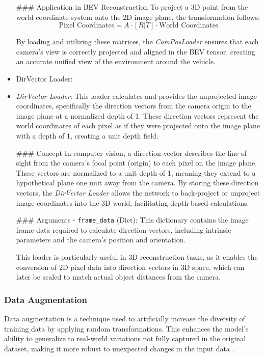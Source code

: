 \begin{itemize}
### Application in BEV Reconstruction
To project a 3D point from the world coordinate system onto the 2D image plane, the transformation follows:
\begin{equation}
    \text{Pixel Coordinates} = A \cdot [R | T] \cdot \text{World Coordinates}
\end{equation}

By loading and utilizing these matrices, the \textit{CamPosLoader} ensures that each camera’s view is correctly projected and aligned in the BEV tensor, creating an accurate unified view of the environment around the vehicle.

\item DirVector Loader:\item \textit{DirVector Loader}: This loader calculates and provides the unprojected image coordinates, specifically the direction vectors from the camera origin to the image plane at a normalized depth of 1. These direction vectors represent the world coordinates of each pixel as if they were projected onto the image plane with a depth of 1, creating a unit depth field.

### Concept
In computer vision, a direction vector describes the line of sight from the camera’s focal point (origin) to each pixel on the image plane. These vectors are normalized to a unit depth of 1, meaning they extend to a hypothetical plane one unit away from the camera. By storing these direction vectors, the \textit{DirVector Loader} allows the network to back-project or unproject image coordinates into the 3D world, facilitating depth-based calculations.

### Arguments
- \texttt{frame\_data} (Dict): This dictionary contains the image frame data required to calculate direction vectors, including intrinsic parameters and the camera’s position and orientation.

This loader is particularly useful in 3D reconstruction tasks, as it enables the conversion of 2D pixel data into direction vectors in 3D space, which can later be scaled to match actual object distances from the camera.

\end{itemize}

\subsubsection*{Data Augmentation} 

Data augmentation is a technique used to artificially increase the diversity of training data by applying random transformations. This enhances the model’s ability to generalize to real-world variations not fully captured in the original dataset, making it more robust to unexpected changes in the input data \cite{MUMUNI2022100258}.

